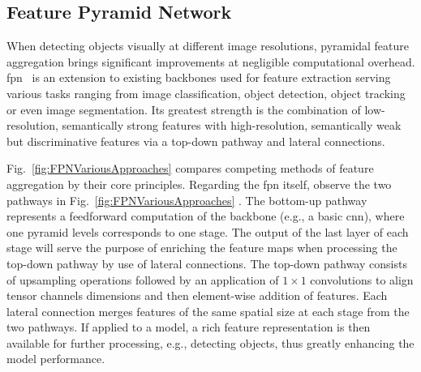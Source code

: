 \subsection{Feature Pyramid Network}
\label{ssec:FeaturePyramidNetwork}

When detecting objects visually at different image resolutions, pyramidal feature aggregation brings significant improvements at negligible computational overhead. \Gls{fpn}~\cite{lin2017fpn} is an extension to existing backbones used for feature extraction serving various tasks ranging from image classification, object detection, object tracking or even image segmentation. Its greatest strength is the combination of low-resolution, semantically strong features with high-resolution, semantically weak but discriminative features via a top-down pathway and lateral connections.

Fig.~\ref{fig:FPNVariousApproaches} compares competing methods of feature aggregation by their core principles. Regarding the \gls{fpn} itself, observe the two pathways in Fig.~\ref{fig:FPNVariousApproaches} . The bottom-up pathway represents a feedforward computation of the backbone (e.g., a basic \gls{cnn}), where one pyramid levels corresponds to one stage. The output of the last layer of each stage will serve the purpose of enriching the feature maps when processing the top-down pathway by use of lateral connections. The top-down pathway consists of upsampling operations followed by an application of $1 \times 1$ convolutions to align tensor channels dimensions and then element-wise addition of features. Each lateral connection merges features of the same spatial size at each stage from the two pathways. If applied to a model, a rich feature representation is then available for further processing, e.g., detecting objects, thus greatly enhancing the model performance.

